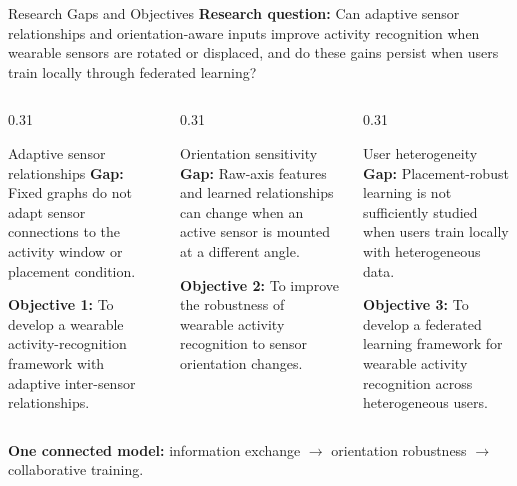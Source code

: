 \documentclass[10pt,aspectratio=169]{beamer}
\begin{document}
\begin{frame}[t]{Research Gaps and Objectives}
\small
\textbf{Research question:} Can adaptive sensor relationships and orientation-aware inputs improve activity recognition when wearable sensors are rotated or displaced, and do these gains persist when users train locally through federated learning?
\smallskip
\begin{columns}[T,onlytextwidth]
\begin{column}{0.31\textwidth}
\begin{block}{Adaptive sensor relationships}
\textbf{Gap:} Fixed graphs do not adapt sensor connections to the activity window or placement condition.\par\smallskip
\textbf{Objective 1:} To develop a wearable activity-recognition framework with adaptive inter-sensor relationships.
\end{block}
\end{column}
\begin{column}{0.31\textwidth}
\begin{block}{Orientation sensitivity}
\textbf{Gap:} Raw-axis features and learned relationships can change when an active sensor is mounted at a different angle.\par\smallskip
\textbf{Objective 2:} To improve the robustness of wearable activity recognition to sensor orientation changes.
\end{block}
\end{column}
\begin{column}{0.31\textwidth}
\begin{block}{User heterogeneity}
\textbf{Gap:} Placement-robust learning is not sufficiently studied when users train locally with heterogeneous data.\par\smallskip
\textbf{Objective 3:} To develop a federated learning framework for wearable activity recognition across heterogeneous users.
\end{block}
\end{column}
\end{columns}
\medskip
\textbf{One connected model:} information exchange $\rightarrow$ orientation robustness $\rightarrow$ collaborative training.
\end{frame}
\end{document}
